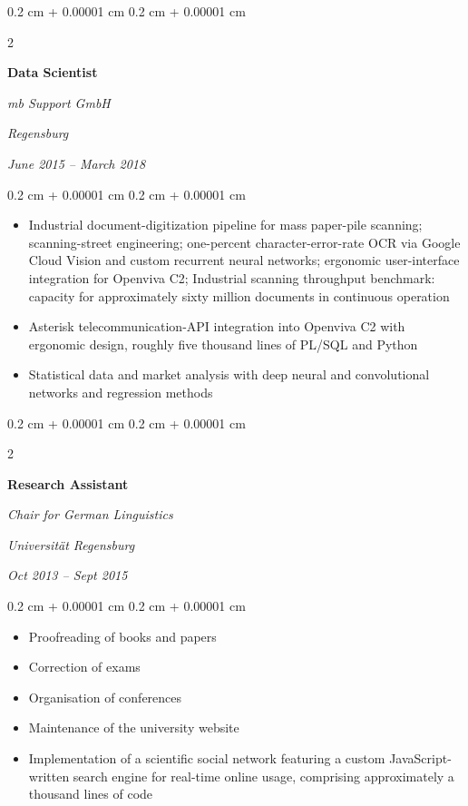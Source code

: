 \documentclass[10pt, letterpaper]{article}
\newenvironment{highlights}{
    \begin{itemize}[
        topsep=0.10 cm,
        parsep=0.10 cm,
        partopsep=0pt,
        itemsep=0pt,
        leftmargin=0.4 cm + 10pt
    ]
}{
    \end{itemize}
}
\newenvironment{onecolentry}{
    \begin{adjustwidth}{
        0.2 cm + 0.00001 cm
    }{
        0.2 cm + 0.00001 cm
    }
}{
    \end{adjustwidth}
}
\newenvironment{twocolentry}[2][]{
    \onecolentry
    \def\secondColumn{#2}
    \setcolumnwidth{\fill, 4.5 cm}
    \begin{paracol}{2}
}{
    \switchcolumn \raggedleft \secondColumn
    \end{paracol}
    \endonecolentry
}
\begin{document}
\begin{twocolentry}{
    \textit{Regensburg}    
    
    \textit{June 2015 – March 2018}}
    \textbf{Data Scientist}
    
    \textit{mb Support GmbH}
\end{twocolentry}

\vspace{0.10 cm}
\begin{onecolentry}
	\begin{highlights}
		\item Industrial document-digitization pipeline for mass paper-pile scanning; scanning-street engineering; one-percent character-error-rate OCR via Google Cloud Vision and custom recurrent neural networks; ergonomic user-interface integration for Openviva C2; Industrial scanning throughput benchmark: capacity for approximately sixty million documents in continuous operation
        \item Asterisk telecommunication-API integration into Openviva C2 with ergonomic design, roughly five thousand lines of PL/SQL and Python
        \item Statistical data and market analysis with deep neural and convolutional networks and regression methods
	\end{highlights}
\end{onecolentry}
\vspace{0.2 cm}

\begin{twocolentry}{
    \textit{Universität Regensburg}    
    
    \textit{Oct 2013 – Sept 2015}}
    \textbf{Research Assistant}
    
    \textit{Chair for German Linguistics}
\end{twocolentry}

\vspace{0.10 cm}
\begin{onecolentry}
	\begin{highlights}
		\item Proofreading of books and papers
        \item Correction of exams
        \item Organisation of conferences
        \item Maintenance of the university website
        \item Implementation of a scientific social network featuring a custom JavaScript-written search engine for real-time online usage, comprising approximately a thousand lines of code
	\end{highlights}
\end{onecolentry}
\vspace{0.2 cm}
\end{document}
